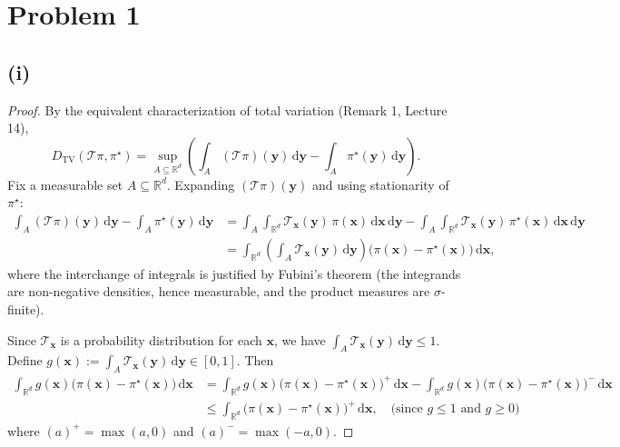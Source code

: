 \section*{Problem 1}

\subsection*{(i)}

\begin{proof}
By the equivalent characterization of total variation (Remark 1, Lecture 14),
\[
D_{\mathrm{TV}}(\mathcal{T}\pi, \pi^\star)
= \sup_{A \subseteq \mathbb{R}^d} \left( \int_{A} (\mathcal{T}\pi)(\mathbf{y}) \,\mathrm{d}\mathbf{y} - \int_{A} \pi^\star(\mathbf{y}) \,\mathrm{d}\mathbf{y} \right).
\]
Fix a measurable set $A \subseteq \mathbb{R}^d$. Expanding $(\mathcal{T}\pi)(\mathbf{y})$ and using stationarity of $\pi^\star$:
\begin{align*}
\int_{A} (\mathcal{T}\pi)(\mathbf{y}) \,\mathrm{d}\mathbf{y} - \int_{A} \pi^\star(\mathbf{y}) \,\mathrm{d}\mathbf{y}
&= \int_{A} \int_{\mathbb{R}^d} \mathcal{T}_{\mathbf{x}}(\mathbf{y})\, \pi(\mathbf{x}) \,\mathrm{d}\mathbf{x} \,\mathrm{d}\mathbf{y} - \int_{A} \int_{\mathbb{R}^d} \mathcal{T}_{\mathbf{x}}(\mathbf{y})\, \pi^\star(\mathbf{x}) \,\mathrm{d}\mathbf{x} \,\mathrm{d}\mathbf{y} \\
&= \int_{\mathbb{R}^d} \left( \int_{A} \mathcal{T}_{\mathbf{x}}(\mathbf{y}) \,\mathrm{d}\mathbf{y} \right) \bigl(\pi(\mathbf{x}) - \pi^\star(\mathbf{x})\bigr) \,\mathrm{d}\mathbf{x},
\end{align*}
where the interchange of integrals is justified by Fubini's theorem (the integrands are non-negative densities, hence measurable, and the product measures are $\sigma$-finite).

Since $\mathcal{T}_{\mathbf{x}}$ is a probability distribution for each $\mathbf{x}$, we have $\int_{A} \mathcal{T}_{\mathbf{x}}(\mathbf{y}) \,\mathrm{d}\mathbf{y} \leq 1$. Define $g(\mathbf{x}) := \int_{A} \mathcal{T}_{\mathbf{x}}(\mathbf{y}) \,\mathrm{d}\mathbf{y} \in [0, 1]$. Then
\begin{align*}
\int_{\mathbb{R}^d} g(\mathbf{x}) \bigl(\pi(\mathbf{x}) - \pi^\star(\mathbf{x})\bigr) \,\mathrm{d}\mathbf{x}
&= \int_{\mathbb{R}^d} g(\mathbf{x}) \bigl(\pi(\mathbf{x}) - \pi^\star(\mathbf{x})\bigr)^+ \,\mathrm{d}\mathbf{x} - \int_{\mathbb{R}^d} g(\mathbf{x}) \bigl(\pi(\mathbf{x}) - \pi^\star(\mathbf{x})\bigr)^- \,\mathrm{d}\mathbf{x} \\
&\leq \int_{\mathbb{R}^d} \bigl(\pi(\mathbf{x}) - \pi^\star(\mathbf{x})\bigr)^+ \,\mathrm{d}\mathbf{x}, \quad \text{(since } g \leq 1 \text{ and } g \geq 0\text{)}
\end{align*}
where $(a)^+ = \max(a, 0)$ and $(a)^- = \max(-a, 0)$.


\end{proof}

